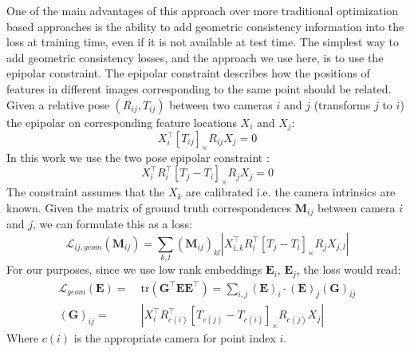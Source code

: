 \documentclass[10pt,twocolumn,letterpaper]{article}
\newcommand{\mat}[1]{\mathbf{#1}}
\newcommand{\cross}[1]{[#1]_{\times}}
\begin{document}
One of the main advantages of this approach over more traditional optimization based approaches is the ability to add geometric consistency information into the loss at training time, even if it is not available at test time.
The simplest way to add geometric consistency losses, and the approach we use here, is to use the epipolar constraint.
The epipolar constraint describes how the positions of features in different images corresponding to the same point should be related.
Given a relative pose $(R_{ij}, T_{ij})$ between two cameras $i$ and $j$  (transforms $j$ to $i$) the epipolar on corresponding feature locations $X_i$ and $X_j$:
\begin{equation}
X_{i}^\top \cross{T_{ij}}R_{ij} X_{j} = 0
\label{eq:essential_constraint_rel}
\end{equation}
In this work we use the two pose epipolar constraint \cite{tron2014quotient}:
\begin{equation}
X_{i}^\top R_{i}^\top \cross{T_{j} - T_{i}}R_{j} X_{j} = 0
\label{eq:essential_constraint}
\end{equation}
The constraint assumes that the $X_k$ are calibrated i.e. the camera intrinsics are known. 
Given the matrix of ground truth correspondences $\mat{M}_{ij}$ between camera $i$ and $j$, we can formulate this as a loss:
\begin{equation}
\mathcal{L}_{ij,geom}(\mat{M}_{ij}) = \sum_{k,l} (\mat{M}_{ij})_{kl} \left|X_{i,k}^\top R_{i}^\top \cross{T_{j} - T_{i}}R_{j} X_{j,l}\right|
\label{eq:geom_cost}
\end{equation}
For our purposes, since we use low rank embeddings $\mat{E}_{i}$, $\mat{E}_{j}$, the loss would read:
\begin{align}
\mathcal{L}_{geom}(\mat{E})
=&\; \mathrm{tr}(\mat{G}^\top \mat{E}\mat{E}^\top) = \sum_{i,j} (\mat{E})_{i} \cdot (\mat{E})_{j} (\mat{G})_{ij} \\
(\mat{G})_{ij} =&\; \left|X_{i}^\top R_{c(i)}^\top \cross{T_{c(j)} - T_{c(i)}}R_{c(j)} X_{j}\right| \nonumber
\label{eq:geom_cost2}
\end{align}
Where $c(i)$ is the appropriate camera for point index $i$.
\end{document}
